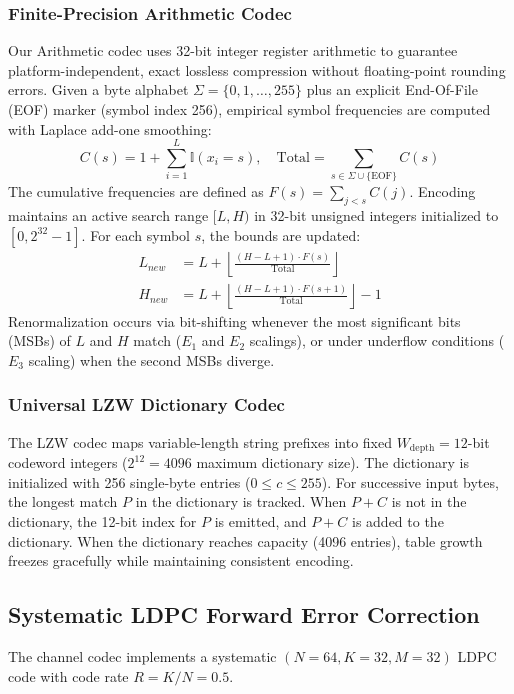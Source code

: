 \documentclass[conference]{IEEEtran}
\begin{document}
\subsubsection{Finite-Precision Arithmetic Codec}
Our Arithmetic codec uses 32-bit integer register arithmetic to guarantee platform-independent, exact lossless compression without floating-point rounding errors. Given a byte alphabet $\Sigma = \{0, 1, \dots, 255\}$ plus an explicit End-Of-File (EOF) marker (symbol index 256), empirical symbol frequencies are computed with Laplace add-one smoothing:
\begin{equation}
C(s) = 1 + \sum_{i=1}^L \mathbb{I}(x_i = s), \quad \text{Total} = \sum_{s \in \Sigma \cup \{\text{EOF}\}} C(s)
\end{equation}
The cumulative frequencies are defined as $F(s) = \sum_{j < s} C(j)$. Encoding maintains an active search range $[L, H)$ in 32-bit unsigned integers initialized to $[0, 2^{32}-1]$. For each symbol $s$, the bounds are updated:
\begin{align}
L_{new} &= L + \left\lfloor \frac{(H - L + 1) \cdot F(s)}{\text{Total}} \right\rfloor \\
H_{new} &= L + \left\lfloor \frac{(H - L + 1) \cdot F(s+1)}{\text{Total}} \right\rfloor - 1
\end{align}
Renormalization occurs via bit-shifting whenever the most significant bits (MSBs) of $L$ and $H$ match ($E_1$ and $E_2$ scalings), or under underflow conditions ($E_3$ scaling) when the second MSBs diverge.

\subsubsection{Universal LZW Dictionary Codec}
The LZW codec maps variable-length string prefixes into fixed $W_{\text{depth}} = 12$-bit codeword integers ($2^{12} = 4096$ maximum dictionary size). The dictionary is initialized with 256 single-byte entries ($0 \le c \le 255$). For successive input bytes, the longest match $P$ in the dictionary is tracked. When $P + C$ is not in the dictionary, the 12-bit index for $P$ is emitted, and $P + C$ is added to the dictionary. When the dictionary reaches capacity (4096 entries), table growth freezes gracefully while maintaining consistent encoding.

\subsection{Systematic LDPC Forward Error Correction}
The channel codec implements a systematic $(N=64, K=32, M=32)$ LDPC code with code rate $R = K/N = 0.5$.
\end{document}
